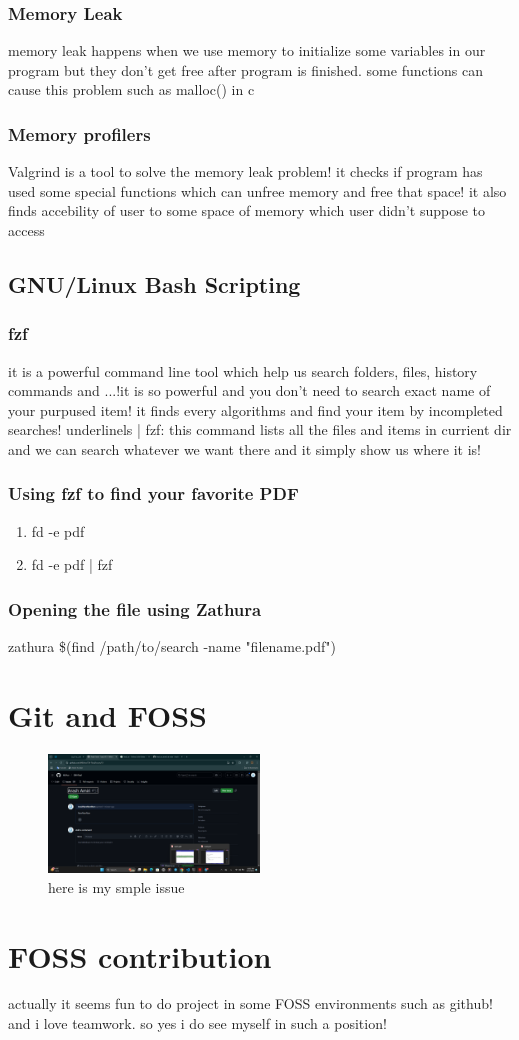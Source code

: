 \documentclass[titlepage]{article}
\begin{document}
\subsubsection{Memory Leak}
memory leak happens when we use memory to initialize some variables in our program but they don't get free after program is finished. some functions can cause this problem such as malloc() in c
\subsubsection{Memory profilers}
Valgrind is a tool to solve the memory leak problem! it checks if program has used some special functions which can unfree memory and free that space! it also finds accebility of user to some space of memory which user didn't suppose to access
\subsection{GNU/Linux Bash Scripting}
\subsubsection{fzf}
it is a powerful command line tool which help us search folders, files, history commands and ...!it is so powerful and you don't need to search exact name of your purpused item! it finds every algorithms and find your item by incompleted searches!\newline
underline{ls | fzf}:\newline
this command lists all the files and items in currient dir and we can search whatever we want there and it simply show us where it is!
\subsubsection{ Using fzf to find your favorite PDF}
\begin{enumerate}
    \item fd -e pdf
    \item fd -e pdf | fzf
\end{enumerate}
\subsubsection{Opening the file using Zathura}
zathura \$(find /path/to/search -name "filename.pdf")
\section{Git and FOSS}
\begin{figure}[h]
    \centering
    \includegraphics[width=0.5\textwidth]{image.png}
    \caption{here is my smple issue}
\end{figure}
\section*{FOSS contribution}
actually it seems fun to do project in some FOSS environments such as github! and i love teamwork. so yes i do see myself in such a position!
\end{document}
